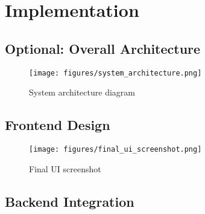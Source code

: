 
\chapter{Implementation} %
\label{chap:implementation}

\section{Optional: Overall Architecture}
\begin{figure}[H]
    \centering
    \texttt{[image: figures/system\_architecture.png]}
    \caption{System architecture diagram}
\end{figure}


\section{Frontend Design}


\begin{figure}[H]
    \centering
    \texttt{[image: figures/final\_ui\_screenshot.png]}
    \caption{Final UI screenshot}
\end{figure}

\section{Backend Integration}

